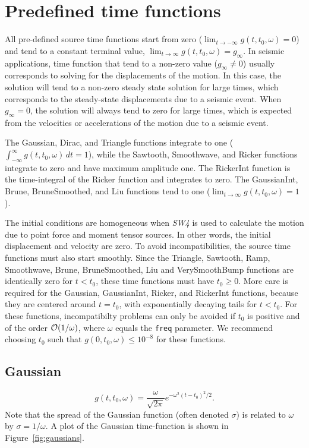 \documentclass[11pt]{report}
\begin{document}
\section{Predefined time functions}\label{sec:predefined}

All pre-defined source time functions start from zero ($\lim_{t\to -\infty} g(t,t_0,\omega) = 0$)
and tend to a constant terminal value, $\lim_{t\to \infty} g(t,t_0,\omega) = g_\infty$. In seismic
applications, time function that tend to a non-zero value ($g_\infty\ne 0$) usually corresponds to
solving for the displacements of the motion. In this case, the solution will tend to a non-zero
steady state solution for large times, which corresponds to the steady-state displacements due to a
seismic event. When $g_\infty = 0$, the solution will always tend to zero for large times, which is
expected from the velocities or accelerations of the motion due to a seismic event.

The Gaussian, Dirac, and Triangle functions integrate to one ($\int_{-\infty}^{\infty}
g(t,t_0,\omega) \, dt = 1$), while the Sawtooth, Smoothwave, and Ricker functions integrate to zero
and have maximum amplitude one. The RickerInt function is the time-integral of the Ricker function
and integrates to zero. The GaussianInt, Brune, BruneSmoothed, and Liu functions tend to one
($\lim_{t\to\infty} g(t,t_0,\omega) = 1$).

The initial conditions are homogeneous when \emph{SW4} is used to calculate the motion due to point
force and moment tensor sources. In other words, the initial displacement and velocity are zero. To
avoid incompatibilities, the source time functions must also start smoothly. Since the Triangle,
Sawtooth, Ramp, Smoothwave, Brune, BruneSmoothed, Liu and VerySmoothBump functions are identically
zero for $t<t_0$, these time functions must have $t_0\geq 0$. More care is required for the
Gaussian, GaussianInt, Ricker, and RickerInt functions, because they are centered around $t=t_0$,
with exponentially decaying tails for $t<t_0$. For these functions, incompatibilty problems can only
be avoided if $t_0$ is positive and of the order ${\cal O}(1/\omega)$, where $\omega$ equals the
{\tt freq} parameter. We recommend choosing $t_0$ such that $g(0,t_0,\omega) \leq 10^{-8}$ for these
functions.

\subsection{Gaussian}\label{gaussian}
  \[
  g(t,t_0,\omega) = \dfrac{\omega}{\sqrt{2 \pi}} e^{-\omega^2 (t - t_0)^2 /2}.
  \] 
Note that the spread of the Gaussian function (often denoted $\sigma$) is related to $\omega$ by
$\sigma = 1 / \omega$. A plot of the Gaussian time-function is shown in Figure~\ref{fig:gaussians}.
\end{document}
